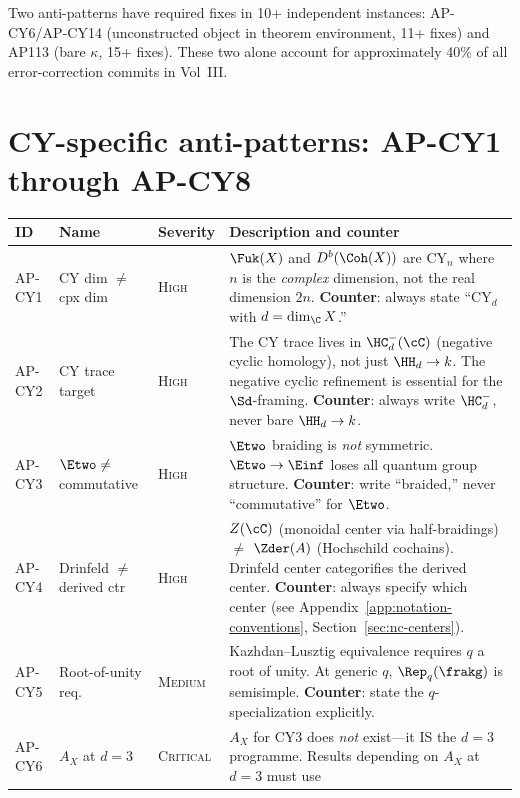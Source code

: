 \noindent
Two anti-patterns have required fixes in 10+ independent instances:
AP-CY6/AP-CY14 (unconstructed object in theorem environment,
11+ fixes) and AP113 (bare $\kappa$, 15+ fixes).  These two
alone account for approximately 40\% of all error-correction
commits in Vol~III.

\section{CY-specific anti-patterns: AP-CY1 through AP-CY8}
\label{sec:ap-cy1-8-full}

{%
\small
\begin{longtable}{@{}p{1.6cm}p{2.4cm}lp{7.4cm}@{}}
\toprule
\textbf{ID} & \textbf{Name} & \textbf{Severity}
  & \textbf{Description and counter} \\
\midrule
\endhead
AP-CY1 & CY dim $\neq$ cpx dim & \textsc{High} &
  $\Fuk(X)$ and $D^b(\Coh(X))$ are CY$_n$ where $n$ is the
  \emph{complex} dimension, not the real dimension $2n$.
  \textbf{Counter}: always state ``CY$_d$ with
  $d = \dim_\C X$.'' \\
\midrule
AP-CY2 & CY trace target & \textsc{High} &
  The CY trace lives in $\HC^-_d(\cC)$ (negative cyclic homology),
  not just $\HH_d \to k$.  The negative cyclic refinement is
  essential for the $\Sd$-framing.
  \textbf{Counter}: always write $\HC^-_d$, never bare
  $\HH_d \to k$. \\
\midrule
AP-CY3 & $\Etwo \neq$ commutative & \textsc{High} &
  $\Etwo$ braiding is \emph{not} symmetric.
  $\Etwo \to \Einf$ loses all quantum group structure.
  \textbf{Counter}: write ``braided,'' never ``commutative''
  for $\Etwo$. \\
\midrule
AP-CY4 & Drinfeld $\neq$ derived ctr & \textsc{High} &
  $Z(\cC)$ (monoidal center via half-braidings) $\neq$
  $\Zder(A)$ (Hochschild cochains).
  Drinfeld center categorifies the derived center.
  \textbf{Counter}: always specify which center
  (see Appendix~\ref{app:notation-conventions},
  Section~\ref{sec:nc-centers}). \\
\midrule
AP-CY5 & Root-of-unity req. & \textsc{Medium} &
  Kazhdan--Lusztig equivalence requires $q$ a root of unity.
  At generic $q$, $\Rep_q(\frakg)$ is semisimple.
  \textbf{Counter}: state the $q$-specialization explicitly. \\
\midrule
AP-CY6 & $A_X$ at $d=3$ & \textsc{Critical} &
  $A_X$ for CY3 does \emph{not} exist---it IS the $d=3$
  programme.  Results depending on $A_X$ at $d=3$ must use

\end{longtable}}
